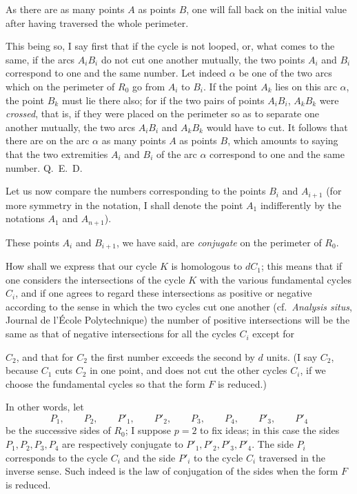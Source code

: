 \documentclass{article}
\begin{document}
As there are as many points $A$ as points $B$, one will fall back on the initial value after having traversed the whole perimeter.

This being so, I say first that if the cycle is not looped, or, what comes to the same, if the arcs $A_{i}B_{i}$ do not cut one another mutually, the two points $A_{i}$ and $B_{i}$ correspond to one and the same number. Let indeed $\alpha$ be one of the two arcs which on the perimeter of $R_{0}$ go from $A_{i}$ to $B_{i}$. If the point $A_{k}$ lies on this arc $\alpha$, the point $B_{k}$ must lie there also; for if the two pairs of points $A_{i}B_{i}$, $A_{k}B_{k}$ were \emph{crossed}, that is, if they were placed on the perimeter so as to separate one another mutually, the two arcs $A_{i}B_{i}$ and $A_{k}B_{k}$ would have to cut. It follows that there are on the arc $\alpha$ as many points $A$ as points $B$, which amounts to saying that the two extremities $A_{i}$ and $B_{i}$ of the arc $\alpha$ correspond to one and the same number. Q.~E.~D.

Let us now compare the numbers corresponding to the points $B_{i}$ and $A_{i+1}$ (for more symmetry in the notation, I shall denote the point $A_{1}$ indifferently by the notations $A_{1}$ and $A_{n+1}$).

These points $A_{i}$ and $B_{i+1}$, we have said, are \emph{conjugate} on the perimeter of $R_{0}$.

How shall we express that our cycle $K$ is homologous to $dC_{1}$; this means that if one considers the intersections of the cycle $K$ with the various fundamental cycles $C_{i}$, and if one agrees to regard these intersections as positive or negative according to the sense in which the two cycles cut one another (cf.\ \emph{Analysis situs}, Journal de l'École Polytechnique) the number of positive intersections will be the same as that of negative intersections for all the cycles $C_{i}$ except for

$C_{2}$, and that for $C_{2}$ the first number exceeds the second by $d$ units. (I say $C_{2}$, because $C_{1}$ cuts $C_{2}$ in one point, and does not cut the other cycles $C_{i}$, if we choose the fundamental cycles so that the form $F$ is reduced.)

In other words, let
\[ P_{1}, \qquad P_{2}, \qquad P'_{1}, \qquad P'_{2}, \qquad P_{3}, \qquad P_{4}, \qquad P'_{3}, \qquad P'_{4} \]
be the successive sides of $R_{0}$; I suppose $p = 2$ to fix ideas; in this case the sides $P_{1}, P_{2}, P_{3}, P_{4}$ are respectively conjugate to $P'_{1}, P'_{2}, P'_{3}, P'_{4}$. The side $P_{i}$ corresponds to the cycle $C_{i}$ and the side $P'_{i}$ to the cycle $C_{i}$ traversed in the inverse sense. Such indeed is the law of conjugation of the sides when the form $F$ is reduced.
\end{document}
